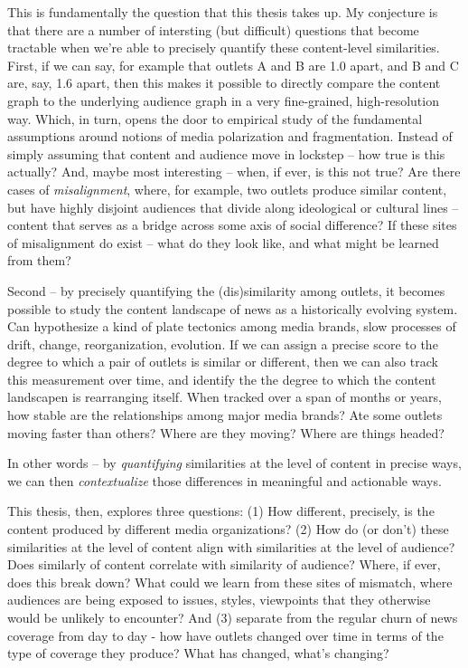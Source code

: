 \documentclass{scrartcl}
\begin{document}
This is fundamentally the question that this thesis takes up. My conjecture is that there are a number of intersting (but difficult) questions that become tractable when we're able to precisely quantify these content-level similarities. First, if we can say, for example that outlets A and B are 1.0 apart, and B and C are, say, 1.6 apart, then this makes it possible to directly compare the content graph to the underlying audience graph in a very fine-grained, high-resolution way. Which, in turn, opens the door to empirical study of the fundamental assumptions around notions of media polarization and fragmentation. Instead of simply assuming that content and audience move in lockstep -- how true is this actually? And, maybe most interesting -- when, if ever, is this not true? Are there cases of \textit{misalignment}, where, for example, two outlets produce similar content, but have highly disjoint audiences that divide along ideological or cultural lines -- content that serves as a bridge across some axis of social difference? If these sites of  misalignment do exist -- what do they look like, and what might be learned from them?

Second -- by precisely quantifying the (dis)similarity among outlets, it becomes possible to study the content landscape of news as a historically evolving system. Can hypothesize a kind of plate tectonics among media brands, slow processes of drift, change, reorganization, evolution. If we can assign a precise score to the degree to which a pair of outlets is similar or different, then we can also track this measurement over time, and identify the the degree to which the content landscapen is rearranging itself. When tracked over a span of months or years, how stable are the relationships among major media brands? Ate some outlets moving faster than others? Where are they moving? Where are things headed?

In other words -- by \textit{quantifying} similarities at the level of content in precise ways, we can then \textit{contextualize} those differences in meaningful and actionable ways.

This thesis, then, explores three questions: (1) How different, precisely, is the content produced by different media organizations? (2) How do (or don't) these similarities at the level of content align with similarities at the level of audience? Does similarly of content correlate with similarity of audience? Where, if ever, does this break down? What could we learn from these sites of mismatch, where audiences are being exposed to issues, styles, viewpoints that they otherwise would be unlikely to encounter? And (3) separate from the regular churn of news coverage from day to day - how have outlets changed over time in terms of the type of coverage they produce? What has changed, what's changing?
\end{document}
